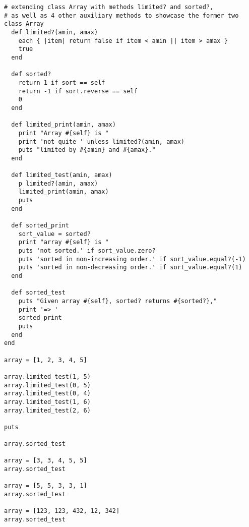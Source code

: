 \documentclass{article}
\begin{document}
\begin{verbatim} 
# extending class Array with methods limited? and sorted?,
# as well as 4 other auxiliary methods to showcase the former two
class Array
  def limited?(amin, amax)
    each { |item| return false if item < amin || item > amax }
    true
  end

  def sorted?
    return 1 if sort == self
    return -1 if sort.reverse == self
    0
  end

  def limited_print(amin, amax)
    print "Array #{self} is "
    print 'not quite ' unless limited?(amin, amax)
    puts "limited by #{amin} and #{amax}."
  end

  def limited_test(amin, amax)
    p limited?(amin, amax)
    limited_print(amin, amax)
    puts
  end

  def sorted_print
    sort_value = sorted?
    print "array #{self} is "
    puts 'not sorted.' if sort_value.zero?
    puts 'sorted in non-increasing order.' if sort_value.equal?(-1)
    puts 'sorted in non-decreasing order.' if sort_value.equal?(1)
  end

  def sorted_test
    puts "Given array #{self}, sorted? returns #{sorted?},"
    print '=> '
    sorted_print
    puts
  end
end

array = [1, 2, 3, 4, 5]

array.limited_test(1, 5)
array.limited_test(0, 5)
array.limited_test(0, 4)
array.limited_test(1, 6)
array.limited_test(2, 6)

puts

array.sorted_test

array = [3, 3, 4, 5, 5]
array.sorted_test

array = [5, 5, 3, 3, 1]
array.sorted_test

array = [123, 123, 432, 12, 342]
array.sorted_test
\end{verbatim}	

\paragraph{}\
\paragraph{}\
\paragraph{}\
\paragraph{}\
\end{document}
